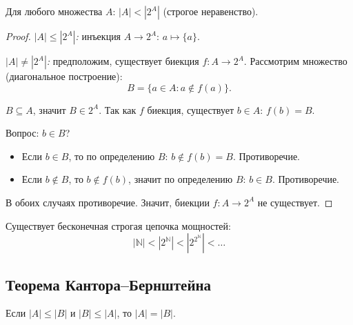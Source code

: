 \documentclass[12pt]{article}
\begin{document}
	\begin{theorem}[Кантор]
		Для любого множества $A$: $|A| < |2^A|$ (строгое неравенство).
	\end{theorem}
	
	\begin{proof}
		\textit{$|A| \leqslant |2^A|$:} инъекция $A \to 2^A$: $a \mapsto \{a\}$.
		
		\textit{$|A| \neq |2^A|$:} предположим, существует биекция $f: A \to 2^A$. Рассмотрим множество (диагональное построение):
		\[B = \{a \in A : a \notin f(a)\}.\]
		
		$B \subseteq A$, значит $B \in 2^A$. Так как $f$ биекция, существует $b \in A$: $f(b) = B$.
		
		Вопрос: $b \in B$?
		\begin{itemize}
			\item Если $b \in B$, то по определению $B$: $b \notin f(b) = B$. Противоречие.
			\item Если $b \notin B$, то $b \notin f(b)$, значит по определению $B$: $b \in B$. Противоречие.
		\end{itemize}
		
		В обоих случаях противоречие. Значит, биекции $f: A \to 2^A$ не существует.
	\end{proof}
	
	\begin{corollary}
		Существует бесконечная строгая цепочка мощностей:
		\[|\mathbb{N}| < |2^{\mathbb{N}}| < |2^{2^\mathbb{N}}| < \dots\]
	\end{corollary}
	
	\subsection{Теорема Кантора--Бернштейна}
	
	\begin{theorem}
		Если $|A| \leqslant |B|$ и $|B| \leqslant |A|$, то $|A| = |B|$.
	\end{theorem}
	
\end{document}
